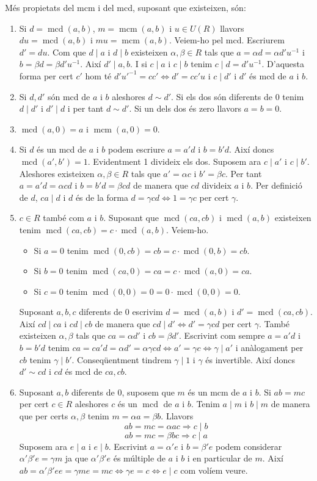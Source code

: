 \documentclass[a4paper,11pt]{report}
\newcommand{\inv}[1]{#1^{-1}}
\DeclareMathOperator{\mcd}{mcd}
\DeclareMathOperator{\mcm}{mcm}
\newcommand{\im}{\Rightarrow}
\theoremstyle{theorem}
\theoremstyle{definition}
\begin{document}
Més propietats del mcm i del mcd, suposant que existeixen, són:
\begin{enumerate}
	\item Si $d=\mcd(a,b)$, $m=\mcm(a,b)$ i $u\in U(R)$ llavors $du=\mcd(a,b)$ i $mu=\mcm(a,b)$. Veiem-ho pel mcd. Escriurem $d'=du$. Com que $d\mid a$ i $d\mid b$ existeixen $\alpha,\beta\in R$ tals que $a=\alpha d=\alpha d'\inv{u}$ i $b=\beta d=\beta d'\inv{u}$. Així $d'\mid a,b$. I si $c\mid a$ i $c\mid b$ tenim $c\mid d=d'\inv{u}$. D'aquesta forma per cert $c'$ hom té $d'\inv{u'}=cc'\Leftrightarrow d'=cc'u$ i $c\mid d'$ i $d'$ és mcd de $a$ i $b$.
	\item Si $d,d'$ són mcd de $a$ i $b$ aleshores $d\sim d'$. Si els dos són diferents de 0 tenim $d\mid d'$ i $d'\mid d$ i per tant $d\sim d'$. Si un dels dos és zero llavors $a=b=0$.
	\item $\mcd(a,0)=a$ i $\mcm(a,0)=0$.
	\item Si $d$ és un mcd de $a$ i $b$ podem escriure $a=a'd$ i $b=b'd$. Així doncs $\mcd(a',b')=1$. Evidentment 1 divideix els dos. Suposem ara $c\mid a'$ i $c\mid b'$. Aleshores existeixen $\alpha,\beta\in R$ tals que $a'=\alpha c$ i $b'=\beta c$. Per tant $a=a'd=\alpha cd$ i $b=b'd=\beta c d$ de manera que $cd$ divideix $a$ i $b$. Per definició de $d$, $ca\mid d$ i $d $ és de la forma $d=\gamma cd\Leftrightarrow1=\gamma c$ per cert $\gamma$.
	\item $c\in R$ també com $a$ i $b$. Suposant que $\mcd(ca,cb)$ i $\mcd(a,b)$ existeixen tenim $\mcd(ca,cb)=c\cdot \mcd(a,b)$. Veiem-ho. \begin{itemize}
	\item 	Si $a=0$ tenim $\mcd(0,cb)=cb=c\cdot\mcd(0,b)=cb$.
	\item 	Si $b=0$ tenim $\mcd(ca,0)=ca=c\cdot\mcd(a,0)=ca$.
	\item Si $c=0$ tenim $\mcd(0,0)=0=0\cdot\mcd(0,0)=0$.
	\end{itemize}
Suposant $a,b,c$ diferents de 0 escrivim $d=\mcd(a,b)$ i $d'=\mcd(ca,cb)$. Així $cd\mid ca$ i $cd\mid cb$ de manera que $cd\mid d'\Leftrightarrow d'=\gamma cd$ per cert $\gamma$. També existeixen $\alpha,\beta$ tals que $ca=\alpha d'$ i $cb=\beta d'$. Escrivint com sempre $a=a'd$ i $b=b'd$ tenim $ca=ca'd=\alpha d'=\alpha\gamma cd\Leftrightarrow a'=\gamma c\Leftrightarrow \gamma\mid a'$ i anàlogament per $cb$ tenim $\gamma\mid b'$. Conseqüentment tindrem $\gamma\mid 1$ i $\gamma $ és invertible. Així doncs $d'\sim cd$ i $cd$ és mcd de $ca,cb$.
\item Suposant $a,b$ diferents de 0, suposem que $m$ és un mcm de $a$ i $b$. Si $ab=mc$ per cert $c\in R$ aleshores $c$ és un $\mcd $ de $a$ i $b$. Tenim $a\mid m$ i $b\mid m$ de manera que per certs $\alpha,\beta$ tenim $m=\alpha a=\beta b$. Llavors $$ab=mc=\alpha ac\im c\mid b$$
$$ab=mc=\beta bc\im c\mid a$$
Suposem ara $e\mid a$ i $e\mid b$. Escrivint $a=\alpha' e$ i $b=\beta' e$ podem considerar $\alpha'\beta'e=\gamma m$ ja que $\alpha'\beta' e$ és múltiple de $a$ i $b$ i en particular de $m$. Així $ab=\alpha'\beta'e e=\gamma m e=mc\Leftrightarrow\gamma e=c\Leftrightarrow e\mid c$ com volíem veure.
\end{enumerate}
\end{document}
